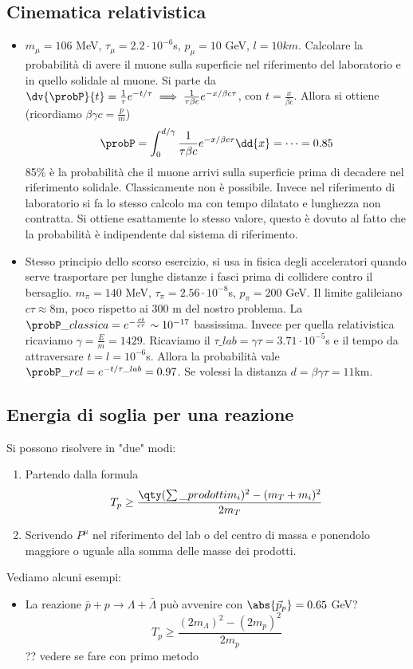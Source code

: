 \subsection{Cinematica relativistica}
\begin{itemize}
    \item $m_\mu=106$ MeV, $\tau_\mu=2.2\cdot10^{-6}$s, $p_\mu=10$ GeV, $l=10km$. Calcolare la probabilità di avere il muone sulla superficie nel riferimento del laboratorio e in quello solidale al muone. Si parte da $\dv{\probP}{t}=\frac1\tau e^{-t/\tau}\implies \frac1{\tau\beta c}e^{-x/\beta c\tau}$, con $t=\frac x{\beta c}$. Allora si ottiene  (ricordiamo $\beta\gamma c=\frac p m$)
    \begin{equation*}
    \probP=\int_0^{d/\gamma}\frac1{\tau\beta c}e^{-x/\beta c \tau}\dd{x}=\dots =0.85
    \end{equation*}
    85\% è la probabilità che il muone arrivi sulla superficie prima di decadere nel riferimento solidale. Classicamente non è possibile. Invece nel riferimento di laboratorio si fa lo stesso calcolo ma con tempo dilatato e lunghezza non contratta. Si ottiene esattamente lo stesso valore, questo è dovuto al fatto che la probabilità è indipendente dal sistema di riferimento.
    \item Stesso principio dello scorso esercizio, si usa in fisica degli acceleratori quando serve trasportare per lunghe distanze i fasci prima di collidere contro il bersaglio. $m_\pi=140$ MeV, $\tau_\pi=2.56\cdot10^{-8}$s, $p_\pi=200$ GeV. Il limite galileiano $c\tau\approx 8$m, poco rispetto ai 300 m del nostro problema. La $\probP\_{classica}=e^{-\frac{ct}{c\tau}}\sim 10^{-17}$ bassissima. Invece per quella relativistica ricaviamo $\gamma=\frac E {m}=1429$. Ricaviamo il $\tau\_{lab}=\gamma \tau =3.71\cdot 10^{-5}$s e il tempo da attraversare $t=l=10^{-6}$s. Allora la probabilità vale $\probP\_{rel}=e^{-t/\tau\_{lab}}=0.97$. Se volessi la distanza $d=\beta \gamma \tau=11$km.
\end{itemize}
\subsection{Energia di soglia per una reazione} 
Si possono risolvere in "due" modi:
\begin{enumerate}
    \item Partendo dalla formula 
    \begin{equation*}
    T_p\geq \frac {\qty(\sum\_{prodotti}m_i)^2 - (m_T+m_i)^2} {2m_T}
    \end{equation*}
    \item Scrivendo $P^\mu$ nel riferimento del lab o del centro di massa e ponendolo maggiore o uguale alla somma delle masse dei prodotti.
\end{enumerate}
Vediamo alcuni esempi:
\begin{itemize}
    \item La reazione $\bar p + p\to \Lambda+\bar\Lambda$ può avvenire con $\abs{\vec p_p}=0.65$ GeV? 
    \begin{equation*}
    T_p\geq \frac {(2m_\Lambda)^2-(2m_p)^2} {2m_p}
    \end{equation*} ?? vedere se fare con primo metodo
\end{itemize}